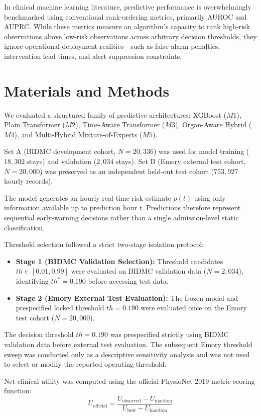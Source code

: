 \documentclass[11pt,a4paper]{article}
\begin{document}
In clinical machine learning literature, predictive performance is overwhelmingly benchmarked using conventional rank-ordering metrics, primarily AUROC and AUPRC. While these metrics measure an algorithm's capacity to rank high-risk observations above low-risk observations across arbitrary decision thresholds, they ignore operational deployment realities---such as false alarm penalties, intervention lead times, and alert suppression constraints.

\section{Materials and Methods}
We evaluated a structured family of predictive architectures: XGBoost ($M1$), Plain Transformer ($M2$), Time-Aware Transformer ($M3$), Organ-Aware Hybrid ($M4$), and Multi-Hybrid Mixture-of-Experts ($M5$).

Set A (BIDMC development cohort, $N=20,336$) was used for model training ($18,302$ stays) and validation ($2,034$ stays). Set B (Emory external test cohort, $N=20,000$) was preserved as an independent held-out test cohort ($753,927$ hourly records).

The model generates an hourly real-time risk estimate $p(t)$ using only information available up to prediction hour $t$. Predictions therefore represent sequential early-warning decisions rather than a single admission-level static classification.

Threshold selection followed a strict two-stage isolation protocol:
\begin{itemize}
    \item \textbf{Stage 1 (BIDMC Validation Selection):} Threshold candidates $th \in [0.01, 0.99]$ were evaluated on BIDMC validation data ($N=2,034$), identifying $th^*=0.190$ before accessing test data.
    \item \textbf{Stage 2 (Emory External Test Evaluation):} The frozen model and prespecified locked threshold $th=0.190$ were evaluated once on the Emory test cohort ($N=20,000$).
\end{itemize}

The decision threshold $th=0.190$ was prespecified strictly using BIDMC validation data before external test evaluation. The subsequent Emory threshold sweep was conducted only as a descriptive sensitivity analysis and was not used to select or modify the reported operating threshold.

Net clinical utility was computed using the official PhysioNet 2019 metric scoring function:
\begin{equation}
U_{\text{official}} = \frac{U_{\text{observed}} - U_{\text{inaction}}}{U_{\text{best}} - U_{\text{inaction}}}
\end{equation}
\end{document}
